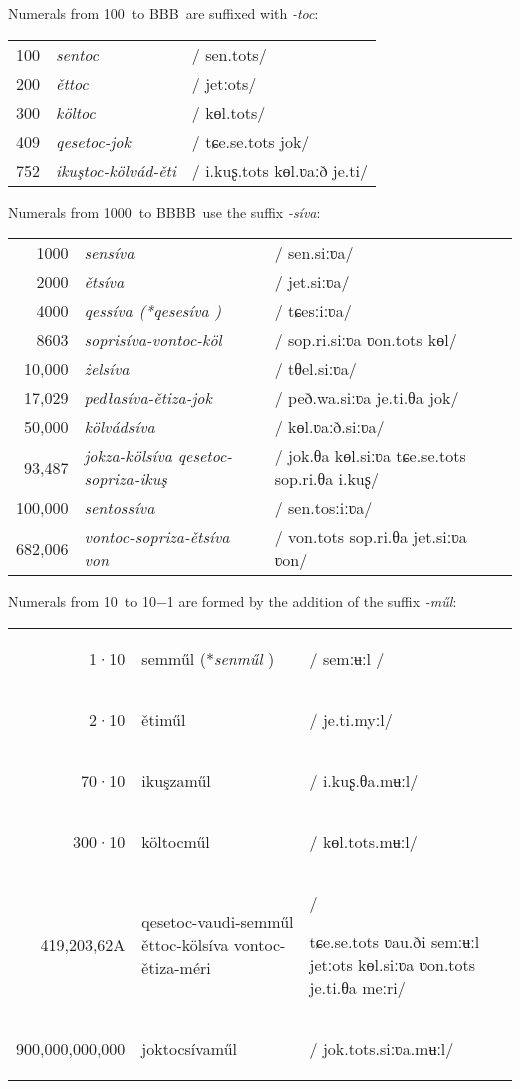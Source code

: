 \documentclass[grammar]{subfiles}
\begin{document}
	Numerals from 100\duo\ to BBB\duo\ are suffixed with \emph{-toc}:

	\begin{exe}
		\ex
		\begin{tabular}[t]{r >{\itshape}l >{/}l<{/}}
			100\duo & sentoc & sen.tots\\
			200\duo & ěttoc & jetːots\\
			300\duo & költoc & kɵl.tots\\
			409\duo & qesetoc-jok & tɕe.se.tots jok\\
			752\duo & ikuştoc-kölvád-ěti & i.kuʂ.tots kɵl.ʋaːð je.ti\\
		\end{tabular}
	\end{exe}

	Numerals from 1000\duo\ to BBBB\duo\  use the suffix \emph{-síva}:

	\begin{exe}
		\ex
		\begin{tabular}[t]{r >{\itshape}l >{/}l<{/}}
			1000\duo    & sensíva & sen.siːʋa\\
			2000\duo    & ětsíva & jet.siːʋa\\
			4000\duo    & qessíva \textup{(*\emph{qesesíva} )} & tɕesːiːʋa\\
			8603\duo    & soprisíva-vontoc-köl & sop.ri.siːʋa ʋon.tots kɵl\\
			10,000\duo  & żelsíva & tθel.siːʋa\\
			17,029\duo  & pedłasíva-ětiza-jok & peð.wa.siːʋa je.ti.θa jok\\
			50,000\duo  & kölvádsíva & kɵl.ʋaːð.siːʋa\\
			93,487\duo  & jokza-kölsíva qesetoc-sopriza-ikuş & jok.θa kɵl.siːʋa tɕe.se.tots sop.ri.θa i.kuʂ\\
			100,000\duo & sentossíva & sen.tosːiːʋa\\
			682,006\duo & vontoc-sopriza-ětsíva von & von.tots sop.ri.θa jet.siːʋa ʋon\\
		\end{tabular}
	\end{exe}

	\newpage
	Numerals from 10\duo\ to 10\duo−1 are formed by the addition of the suffix \emph{-műl}:

	\begin{exe}
		\ex
		\begin{tabular}[t]{r >{\itshape\raggedright}m{5cm} >{/}m{4cm}<{/}}
			1·10\sup6\duo       & semműl \textup{(*\emph{senműl} )} & semːʉːl \\
			2·10\sup6\duo       & ětiműl & je.ti.myːl\\
			70·10\sup6\duo      & ikuşzaműl & i.kuʂ.θa.mʉːl\\
			300·10\sup6\duo     & költocműl & kɵl.tots.mʉːl\\
			419,203,62A\duo     & qesetoc-vaudi-semműl ěttoc-kölsíva vontoc-ětiza-méri & \raggedright tɕe.se.tots ʋau.ði semːʉːl jetːots kɵl.siːʋa ʋon.tots je.ti.θa meːri\tabularnewline
			900,000,000,000\duo & joktocsívaműl & jok.tots.siːʋa.mʉːl\\
		\end{tabular}
	\end{exe}
\end{document}
